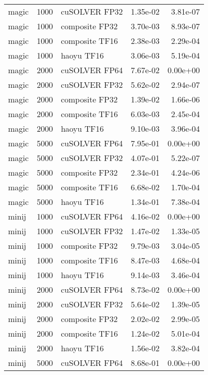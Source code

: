 \begin{table}
\begin{tabular}{lrlrr}
    magic &  1000 &  cuSOLVER FP32 &  1.35e-02 &        3.81e-07 \\
    magic &  1000 & composite FP32 &  3.70e-03 &        8.93e-07 \\
    magic &  1000 & composite TF16 &  2.38e-03 &        2.29e-04 \\
    magic &  1000 &     haoyu TF16 &  3.06e-03 &        5.19e-04 \\
    magic &  2000 &  cuSOLVER FP64 &  7.67e-02 &        0.00e+00 \\
    magic &  2000 &  cuSOLVER FP32 &  5.62e-02 &        2.94e-07 \\
    magic &  2000 & composite FP32 &  1.39e-02 &        1.66e-06 \\
    magic &  2000 & composite TF16 &  6.03e-03 &        2.45e-04 \\
    magic &  2000 &     haoyu TF16 &  9.10e-03 &        3.96e-04 \\
    magic &  5000 &  cuSOLVER FP64 &  7.95e-01 &        0.00e+00 \\
    magic &  5000 &  cuSOLVER FP32 &  4.07e-01 &        5.22e-07 \\
    magic &  5000 & composite FP32 &  2.34e-01 &        4.24e-06 \\
    magic &  5000 & composite TF16 &  6.68e-02 &        1.70e-04 \\
    magic &  5000 &     haoyu TF16 &  1.34e-01 &        7.38e-04 \\
    minij &  1000 &  cuSOLVER FP64 &  4.16e-02 &        0.00e+00 \\
    minij &  1000 &  cuSOLVER FP32 &  1.47e-02 &        1.33e-05 \\
    minij &  1000 & composite FP32 &  9.79e-03 &        3.04e-05 \\
    minij &  1000 & composite TF16 &  8.47e-03 &        4.68e-04 \\
    minij &  1000 &     haoyu TF16 &  9.14e-03 &        3.46e-04 \\
    minij &  2000 &  cuSOLVER FP64 &  8.73e-02 &        0.00e+00 \\
    minij &  2000 &  cuSOLVER FP32 &  5.64e-02 &        1.39e-05 \\
    minij &  2000 & composite FP32 &  2.02e-02 &        2.99e-05 \\
    minij &  2000 & composite TF16 &  1.24e-02 &        5.01e-04 \\
    minij &  2000 &     haoyu TF16 &  1.56e-02 &        3.82e-04 \\
    minij &  5000 &  cuSOLVER FP64 &  8.68e-01 &        0.00e+00 \\

\end{tabular}
\end{table}
